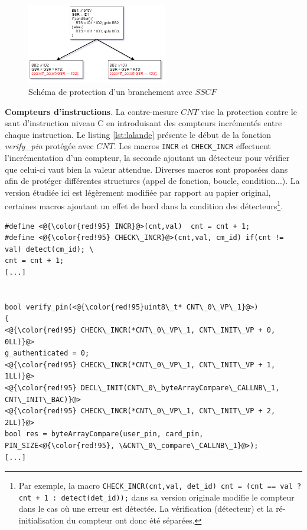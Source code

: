                 \begin{figure}[h]
                \centering
                \includegraphics[width=0.55\textwidth]{ch6-ccpo/img/secswift-CF.png}
                \caption{Schéma de protection d'un branchement avec $SSCF$ \cite{Ferriere/LLVM19}}
                \label{fig:sscf-scheme}
                \end{figure}
            
                \textbf{Compteurs d'instructions}. La contre-mesure $CNT$ vise la protection contre le saut d'instruction niveau C en introduisant des compteurs incrémentés entre chaque instruction.
                Le listing \ref{lst:lalande} présente le début de la fonction \textit{verify\_pin} protégée avec $CNT$.
                Les macros \texttt{INCR} et \texttt{CHECK\_INCR} effectuent l'incrémentation d'un compteur, la seconde ajoutant un détecteur pour vérifier que celui-ci vaut bien la valeur attendue.
                Diverses macros sont proposées dans \cite{lalande} afin de protéger différentes structures (appel de fonction, boucle, condition...). La version étudiée ici est légèrement modifiée par rapport au papier original, certaines macros ajoutant un effet de bord dans la condition des détecteurs\footnote{Par exemple, la macro \texttt{CHECK\_INCR(cnt,val, det\_id) cnt = (cnt == val ? cnt + 1 : detect(det\_id));} dans sa version originale modifie le compteur dans le cas où une erreur est détectée. La vérification (détecteur) et la ré-initialisation du compteur ont donc été séparées.}.
             
\begin{minipage}{0.93\linewidth}
\begin{lstlisting}
#define <@{\color{red!95} INCR}@>(cnt,val)  cnt = cnt + 1;
#define <@{\color{red!95} CHECK\_INCR}@>(cnt,val, cm_id) if(cnt != val) detect(cm_id); \
cnt = cnt + 1;
[...]


bool verify_pin(<@{\color{red!95}uint8\_t* CNT\_0\_VP\_1}@>) 
{
<@{\color{red!95} CHECK\_INCR(*CNT\_0\_VP\_1, CNT\_INIT\_VP + 0, 0LL)}@>
g_authenticated = 0;
<@{\color{red!95} CHECK\_INCR(*CNT\_0\_VP\_1, CNT\_INIT\_VP + 1, 1LL)}@>
<@{\color{red!95} DECL\_INIT(CNT\_0\_byteArrayCompare\_CALLNB\_1, CNT\_INIT\_BAC)}@>
<@{\color{red!95} CHECK\_INCR(*CNT\_0\_VP\_1, CNT\_INIT\_VP + 2, 2LL)}@>
bool res = byteArrayCompare(user_pin, card_pin, PIN_SIZE<@{\color{red!95}, \&CNT\_0\_compare\_CALLNB\_1}@>);
[...]
\end{lstlisting}
\end{minipage}

